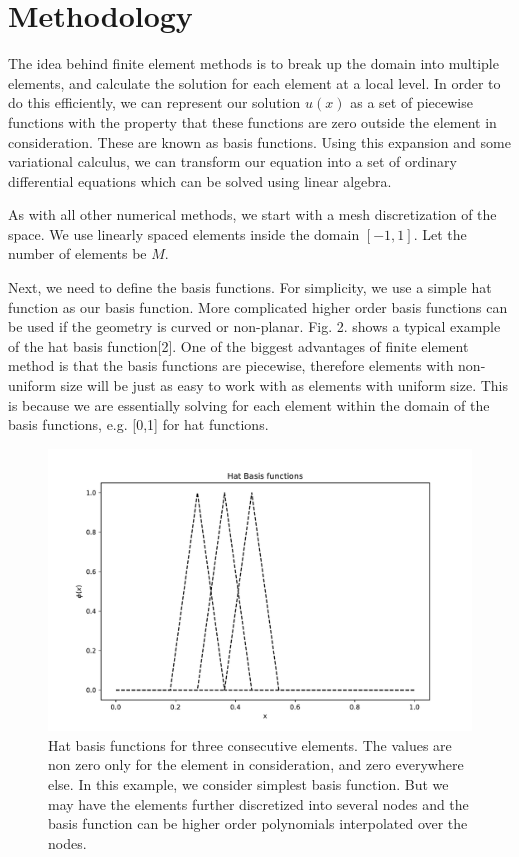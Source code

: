 \documentclass{article}
\begin{document}
\section{Methodology}
The idea behind finite element methods is to break up the domain into multiple elements, and calculate the solution for each element at a local level. In order to do this efficiently, we can represent our solution $u(x)$ as a set of piecewise functions with the property that these functions are zero outside the element in consideration. These are known as basis functions. Using this expansion and some variational calculus, we can transform our equation into a set of ordinary differential equations which can be solved using linear algebra.

As with all other numerical methods, we start with a mesh discretization of the space. We use linearly spaced elements inside the domain $[-1,1]$. Let the number of elements be $M$. 

Next, we need to define the basis functions. For simplicity, we use a simple hat function as our basis function. More complicated higher order basis functions can be used if the geometry is curved or non-planar. Fig. 2. shows a typical example of the hat basis function[2]. One of the biggest advantages of finite element method is that the basis functions are piecewise, therefore elements with non-uniform size will be just as easy to work with as elements with uniform size. This is because we are essentially solving for each element within the domain of the basis functions, e.g. [0,1] for hat functions. 

\begin{figure}[!htb]
    \centering
    \includegraphics[scale=0.5]{fe_basis1.pdf}
    \caption{Hat basis functions for three consecutive elements. The values are non zero only for the element in consideration, and zero everywhere else. In this example, we consider simplest basis function. But we may have the elements further discretized into several nodes and the basis function can be higher order polynomials interpolated over the nodes.}
\end{figure}
\end{document}
